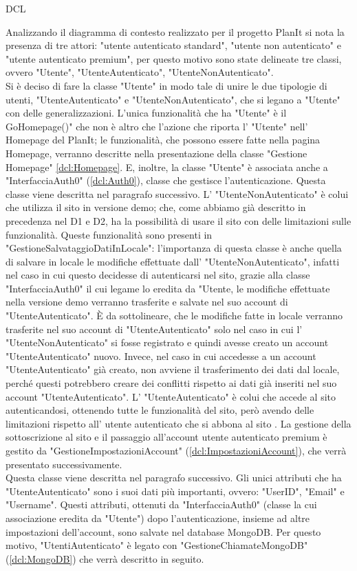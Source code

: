 \begin{listaPersonale}{DCL}

    Analizzando il diagramma di contesto realizzato per il progetto PlanIt si nota la presenza di tre attori: "utente autenticato standard", "utente non autenticato" e "utente autenticato premium", per questo motivo sono state delineate tre classi, ovvero "Utente", "UtenteAutenticato", "UtenteNonAutenticato".\\
    Si è deciso di fare la classe "Utente" in modo tale di unire le due tipologie di utenti, "UtenteAutenticato" e "UtenteNonAutenticato", che si legano a "Utente" con delle generalizzazioni. L'unica funzionalità che ha "Utente" è il GoHomepage()" che non è altro che l'azione che riporta l' "Utente" nell' Homepage del PlanIt; le funzionalità, che possono essere fatte nella pagina Homepage, verranno descritte nella presentazione della classe "Gestione Homepage" \ref{dcl:Homepage}. E, inoltre, la classe "Utente" è associata anche a "InterfacciaAuth0" (\ref{dcl:Auth0}), classe che gestisce l'autenticazione. Questa classe viene descritta nel paragrafo successivo.
    L' "UtenteNonAutenticato" è colui che utilizza il sito in versione demo; che, come abbiamo già descritto in precedenza nel D1 e D2, ha la possibilità di usare il sito con delle limitazioni sulle funzionalità. Queste funzionalità sono presenti in "GestioneSalvataggioDatiInLocale": l'importanza di questa classe è anche quella di salvare in locale le modifiche effettuate dall' "UtenteNonAutenticato", infatti nel caso in cui questo decidesse di autenticarsi nel sito, grazie alla classe "InterfacciaAuth0" il cui legame lo eredita da "Utente, le modifiche effettuate nella versione demo verranno trasferite e salvate nel suo account di "UtenteAutenticato". È da sottolineare, che le modifiche fatte in locale verranno trasferite nel suo account di "UtenteAutenticato" solo nel caso in cui l' "UtenteNonAutenticato" si fosse registrato e quindi avesse creato un account "UtenteAutenticato" nuovo. Invece, nel caso in cui accedesse a un account "UtenteAutenticato" già creato, non avviene il trasferimento dei dati dal locale, perché questi potrebbero creare dei conflitti rispetto ai dati già inseriti nel suo account "UtenteAutenticato".
    L' "UtenteAutenticato" è colui che accede al sito autenticandosi, ottenendo tutte le funzionalità del sito, però avendo delle limitazioni rispetto all' utente autenticato che si abbona al sito . La gestione della sottoscrizione al sito e il passaggio all'account utente autenticato premium è gestito da "GestioneImpostazioniAccount" (\ref{dcl:ImpostazioniAccount}), che verrà presentato successivamente.\\
    Questa classe viene descritta nel paragrafo successivo. Gli unici attributi che ha "UtenteAutenticato" sono i suoi dati più importanti, ovvero: "UserID", "Email" e "Username". Questi attributi, ottenuti da "InterfacciaAuth0" (classe la cui associazione eredita da "Utente") dopo l'autenticazione, insieme ad altre impostazioni dell'account, sono salvate nel database MongoDB. Per questo motivo, "UtentiAutenticato" è legato con "GestioneChiamateMongoDB"(\ref{dcl:MongoDB}) che verrà descritto in seguito.



\end{listaPersonale}
